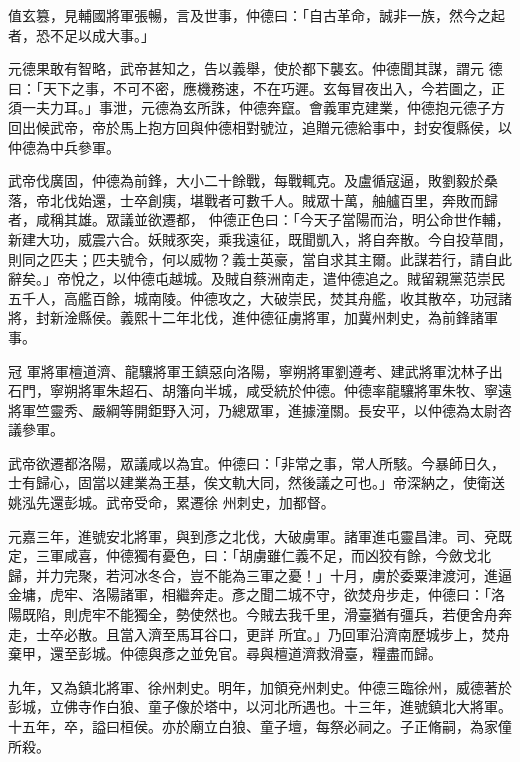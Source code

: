 \begin{pinyinscope}
 值玄篡，見輔國將軍張暢，言及世事，仲德曰：「自古革命，誠非一族，然今之起者，恐不足以成大事。」



 元德果敢有智略，武帝甚知之，告以義舉，使於都下襲玄。仲德聞其謀，謂元
 德曰：「天下之事，不可不密，應機務速，不在巧遲。玄每冒夜出入，今若圖之，正須一夫力耳。」事泄，元德為玄所誅，仲德奔竄。會義軍克建業，仲德抱元德子方回出候武帝，帝於馬上抱方回與仲德相對號泣，追贈元德給事中，封安復縣侯，以仲德為中兵參軍。



 武帝伐廣固，仲德為前鋒，大小二十餘戰，每戰輒克。及盧循寇逼，敗劉毅於桑落，帝北伐始還，士卒創痍，堪戰者可數千人。賊眾十萬，舳艫百里，奔敗而歸者，咸稱其雄。眾議並欲遷都，
 仲德正色曰：「今天子當陽而治，明公命世作輔，新建大功，威震六合。妖賊豕突，乘我遠征，既聞凱入，將自奔散。今自投草間，則同之匹夫；匹夫號令，何以威物？義士英豪，當自求其主爾。此謀若行，請自此辭矣。」帝悅之，以仲德屯越城。及賊自蔡洲南走，遣仲德追之。賊留親黨范崇民五千人，高艦百餘，城南陵。仲德攻之，大破崇民，焚其舟艦，收其散卒，功冠諸將，封新淦縣侯。義熙十二年北伐，進仲德征虜將軍，加冀州刺史，為前鋒諸軍事。



 冠
 軍將軍檀道濟、龍驤將軍王鎮惡向洛陽，寧朔將軍劉遵考、建武將軍沈林子出石門，寧朔將軍朱超石、胡籓向半城，咸受統於仲德。仲德率龍驤將軍朱牧、寧遠將軍竺靈秀、嚴綱等開鉅野入河，乃總眾軍，進據潼關。長安平，以仲德為太尉咨議參軍。



 武帝欲遷都洛陽，眾議咸以為宜。仲德曰：「非常之事，常人所駭。今暴師日久，士有歸心，固當以建業為王基，俟文軌大同，然後議之可也。」帝深納之，使衛送姚泓先還彭城。武帝受命，累遷徐
 州刺史，加都督。



 元嘉三年，進號安北將軍，與到彥之北伐，大破虜軍。諸軍進屯靈昌津。司、兗既定，三軍咸喜，仲德獨有憂色，曰：「胡虜雖仁義不足，而凶狡有餘，今斂戈北歸，并力完聚，若河冰冬合，豈不能為三軍之憂！」十月，虜於委粟津渡河，進逼金墉，虎牢、洛陽諸軍，相繼奔走。彥之聞二城不守，欲焚舟步走，仲德曰：「洛陽既陷，則虎牢不能獨全，勢使然也。今賊去我千里，滑臺猶有彊兵，若便舍舟奔走，士卒必散。且當入濟至馬耳谷口，更詳
 所宜。」乃回軍沿濟南歷城步上，焚舟棄甲，還至彭城。仲德與彥之並免官。尋與檀道濟救滑臺，糧盡而歸。



 九年，又為鎮北將軍、徐州刺史。明年，加領兗州刺史。仲德三臨徐州，威德著於彭城，立佛寺作白狼、童子像於塔中，以河北所遇也。十三年，進號鎮北大將軍。十五年，卒，謚曰桓侯。亦於廟立白狼、童子壇，每祭必祠之。子正脩嗣，為家僮所殺。




\end{pinyinscope}
